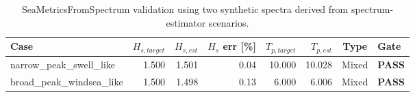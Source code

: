 \begin{table}[H]
\centering
\caption{SeaMetricsFromSpectrum validation using two synthetic spectra derived from spectrum-estimator scenarios.}
\label{tab:sea_metrics_from_spectrum}
\begin{tabular}{lrrrrrcl}
\toprule
Case & $H_{s,target}$ & $H_{s,est}$ & $H_s$ err [\%] & $T_{p,target}$ & $T_{p,est}$ & Type & Gate \\
\midrule
narrow\_peak\_swell\_like & 1.500 & 1.501 & 0.04 & 10.000 & 10.028 & Mixed & \textbf{PASS} \\
broad\_peak\_windsea\_like & 1.500 & 1.498 & 0.13 & 6.000 & 6.006 & Mixed & \textbf{PASS} \\
\bottomrule
\end{tabular}
\end{table}
